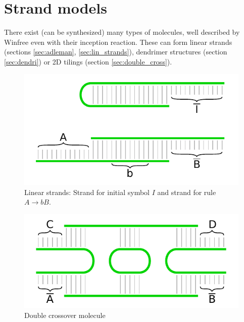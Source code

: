
\section{Strand models}
	
	There exist (can be synthesized) many types of molecules, well described by Winfree \cite{winfree_phd} even with their inception reaction. These can form linear strands (sections \ref{sec:adleman}, \ref{sec:lin_strands}), dendrimer structures (section \ref{sec:dendri}) or 2D tilings (section \ref{sec:double_cross}).
	
	\begin{figure}[H]
	\begin{center}
		\includegraphics{./figures/strand_types/linear.pdf}
		\caption{Linear strands: Strand for initial symbol $I$ and strand for rule $A\rightarrow bB$.}
	\end{center}
	\end{figure}
	
	\begin{figure}[H]
	\begin{center}
		\includegraphics{./figures/strand_types/double_crossover.pdf}
		\caption{Double crossover molecule}
	\end{center}
	\end{figure}
	
